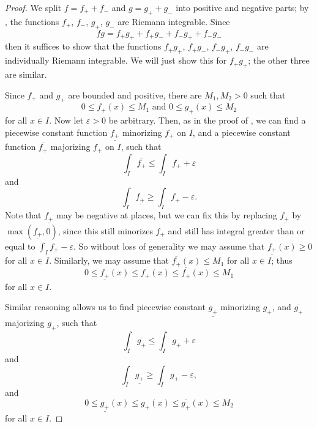 \begin{proof}
  We split \(f = f_+ + f_-\) and \(g = g_+ + g_-\) into positive and negative parts;
  by , the functions \(f_+\), \(f_-\), \(g_+\), \(g_-\) are Riemann integrable.
  Since
  \[
    fg = f_+ g_+ + f_+ g_- + f_- g_+ + f_- g_-
  \]
  then it suffices to show that the functions \(f_+ g_+\), \(f_+ g_-\), \(f_- g_+\), \(f_- g_-\) are individually Riemann integrable.
  We will just show this for \(f_+ g_+\);
  the other three are similar.

  Since \(f_+\) and \(g_+\) are bounded and positive, there are \(M_1, M_2 > 0\) such that
  \[
    0 \leq f_+(x) \leq M_1 \text{ and } 0 \leq g_+(x) \leq M_2
  \]
  for all \(x \in I\).
  Now let \(\varepsilon > 0\) be arbitrary.
  Then, as in the proof of , we can find a piecewise constant function \(\underline{f_+}\) minorizing \(f_+\) on \(I\), and a piecewise constant function \(\overline{f_+}\) majorizing \(f_+\) on \(I\), such that
  \[
    \int_I \overline{f_+} \leq \int_I f_+ + \varepsilon
  \]
  and
  \[
    \int_I \underline{f_+} \geq \int_I f_+ - \varepsilon.
  \]
  Note that \(\underline{f_+}\) may be negative at places, but we can fix this by replacing \(\underline{f_+}\) by \(\max(\underline{f_+}, 0)\), since this still minorizes \(f_+\) and still has integral greater than or equal to \(\int_I f_+ - \varepsilon\).
  So without loss of generality we may assume that \(\underline{f_+}(x) \geq 0\) for all \(x \in I\).
  Similarly, we may assume that \(\overline{f_+}(x) \leq M_1\) for all \(x \in I\);
  thus
  \[
    0 \leq \underline{f_+}(x) \leq f_+(x) \leq \overline{f_+}(x) \leq M_1
  \]
  for all \(x \in I\).

  Similar reasoning allows us to find piecewise constant \(\underline{g_+}\) minorizing \(g_+\), and \(\overline{g_+}\) majorizing \(g_+\), such that
  \[
    \int_I \overline{g_+} \leq \int_I g_+ + \varepsilon
  \]
  and
  \[
    \int_I \underline{g_+} \geq \int_I g_+ - \varepsilon,
  \]
  and
  \[
    0 \leq \underline{g_+}(x) \leq g_+(x) \leq \overline{g_+}(x) \leq M_2
  \]
  for all \(x \in I\).


\end{proof}

